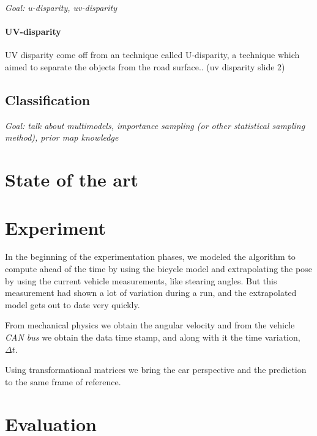 \documentclass{llncs}
\begin{document}
\textit{Goal: u-disparity, uv-disparity}

\paragraph*{UV-disparity} 

UV disparity come off from an technique called U-disparity, a technique which aimed to separate the objects from the road surface.. (uv disparity slide 2)


\subsection{Classification}

\textit{Goal: talk about multimodels, importance sampling (or other statistical sampling method), prior map knowledge }


\section{State of the art}

\section{Experiment}

In the beginning of the experimentation phases, we modeled the algorithm to compute ahead of the time by using the bicycle model and extrapolating the pose by using the current vehicle measurements, like stearing angles. But this measurement had shown a lot of variation during a run, and the extrapolated model gets out to date very quickly.

From mechanical physics we obtain the angular velocity and from the vehicle \emph{CAN bus} we obtain the data time stamp, and along with it the time variation, $\Delta t$.

Using transformational matrices we bring the car perspective \cite{iyengar1991autonomous} and the prediction to the same frame of reference.

\section{Evaluation}

\end{document}
